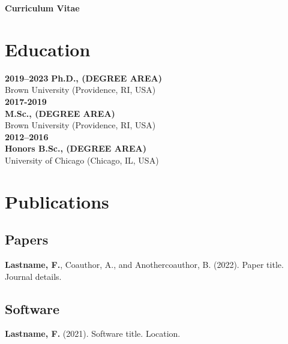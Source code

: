 
\huge{\textbf{Curriculum Vitae}}
\normalsize
\vspace{2mm}

\section*{Education}

{\bf 2019–2023}
{\bf Ph.D., (DEGREE AREA)}\\
Brown University (Providence, RI, USA)\\  

{\bf 2017-2019}\\
{\bf M.Sc., (DEGREE AREA)}\\
Brown University (Providence, RI, USA)\\ 

{\bf 2012–2016}\\
{\bf Honors B.Sc., (DEGREE AREA)}\\
University of Chicago (Chicago, IL, USA)

\vspace{-0\baselineskip}
\section*{Publications}

\vspace{-0\baselineskip}
\subsection*{Papers}

{\bf Lastname, F.}, Coauthor, A., and Anothercoauthor, B. (2022). Paper title. Journal details.\\

\vspace{-0\baselineskip}
\subsection*{Software}

\textbf{Lastname, F.} (2021). Software title. Location.\\

\vspace{-0\baselineskip}
